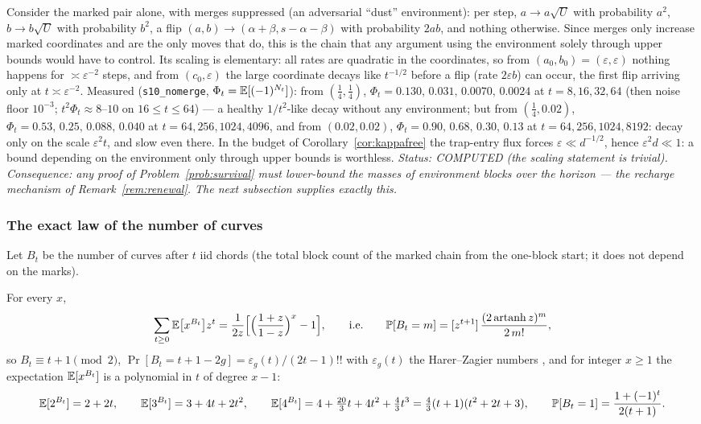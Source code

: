 Consider the marked pair alone, with merges suppressed (an adversarial
``dust'' environment): per step, $a\to a\sqrt U$ with probability
$a^2$, $b\to b\sqrt U$ with probability $b^2$, a flip
$(a,b)\to(\alpha+\beta,s-\alpha-\beta)$ with probability $2ab$, and
nothing otherwise.  Since merges only increase marked coordinates and
are the only moves that do, this is the chain that any argument using
the environment solely through upper bounds would have to control.
Its scaling is elementary: all rates are quadratic in the coordinates,
so from $(a_0,b_0)=(\varepsilon,\varepsilon)$ nothing happens for
$\asymp\varepsilon^{-2}$ steps, and from $(c_0,\varepsilon)$ the large
coordinate decays like $t^{-1/2}$ before a flip (rate $2\varepsilon b$)
can occur, the first flip arriving only at $t\asymp\varepsilon^{-2}$.
Measured (\texttt{s10\_nomerge}, $\Phi_t=\mathbb{E}[(-1)^{N_t}]$):
from $(\tfrac14,\tfrac14)$, $\Phi_t=0.130,\,0.031,\,0.0070,\,0.0024$
at $t=8,16,32,64$ (then noise floor $10^{-3}$; $t^2\Phi_t\approx8$--$10$
on $16\le t\le64$) --- a healthy $1/t^2$-like decay without any
environment; but from $(\tfrac14,0.02)$,
$\Phi_t=0.53,\,0.25,\,0.088,\,0.040$ at $t=64,256,1024,4096$, and from
$(0.02,0.02)$, $\Phi_t=0.90,\,0.68,\,0.30,\,0.13$ at
$t=64,256,1024,8192$: decay only on the scale $\varepsilon^2t$, and
slow even there.  In the budget of Corollary~\ref{cor:kappafree} the
trap-entry flux forces $\varepsilon\ll d^{-1/2}$, hence
$\varepsilon^2d\ll1$: a bound depending on the environment only
through upper bounds is worthless.  \emph{Status: COMPUTED (the scaling
statement is trivial).  Consequence: any proof of
Problem~\ref{prob:survival} must lower-bound the masses of environment
blocks over the horizon --- the recharge mechanism of
Remark~\ref{rem:renewal}.  The next subsection supplies exactly this.}

\subsubsection{The exact law of the number of curves}\label{sec:blockcount}

Let $B_t$ be the number of curves after $t$ iid chords (the total
block count of the marked chain from the one-block start; it does not
depend on the marks).

\begin{theorem}\label{thm:blockcount}
For every $x$,
\[
\sum_{t\ge0}\mathbb{E}\bigl[x^{B_t}\bigr]z^t
=\frac1{2z}\Bigl[\Bigl(\frac{1+z}{1-z}\Bigr)^{x}-1\Bigr],
\qquad\text{i.e.}\qquad
\mathbb{P}[B_t=m]=[z^{t+1}]\,\frac{(2\operatorname{artanh}z)^m}{2\,m!},
\]
so $B_t\equiv t+1\pmod2$, $\Pr[B_t=t+1-2g]=\varepsilon_g(t)/(2t-1)!!$
with $\varepsilon_g(t)$ the Harer--Zagier numbers \cite{HZ86}, and for
integer $x\ge1$ the expectation $\mathbb{E}[x^{B_t}]$ is a polynomial in $t$ of
degree $x-1$:
\[
\mathbb{E}[2^{B_t}]=2+2t,\qquad \mathbb{E}[3^{B_t}]=3+4t+2t^2,\qquad
\mathbb{E}[4^{B_t}]=4+\tfrac{20}3t+4t^2+\tfrac43t^3=\tfrac43(t+1)(t^2+2t+3),\qquad
\mathbb{P}[B_t=1]=\frac{1+(-1)^t}{2(t+1)}.
\]
\end{theorem}

